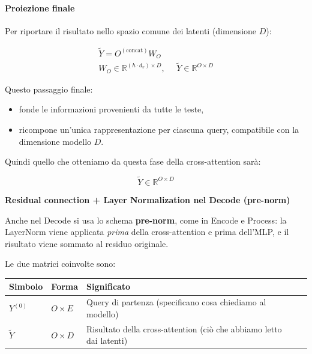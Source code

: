 \documentclass[
  11pt,
]{article}
\newcounter{none} %
\begin{document}
\paragraph{Proiezione finale}

Per riportare il risultato nello spazio comune dei latenti (dimensione
\(D\)):

\[\begin{matrix}
\widetilde{Y} = O^{(\text{concat})}W_{O} \\
W_{O} \in \mathbb{R}^{\left( h \cdot d_{v} \right) \times D},\ \ \ \ \ \ \widetilde{Y} \in \mathbb{R}^{O \times D}
\end{matrix}\]

Questo passaggio finale:

\begin{itemize}
\item
  fonde le informazioni provenienti da tutte le teste,
\item
  ricompone un'unica rappresentazione per ciascuna
  query, compatibile con la dimensione modello \(D\).
\end{itemize}

Quindi quello che otteniamo da questa fase della cross-attention sarà:

\[\widetilde{Y} \in \mathbb{R}^{O \times D}\]

\textbf{Residual connection + Layer Normalization nel Decode (pre-norm)}

Anche nel Decode si usa lo schema \textbf{pre-norm}, come in Encode e Process: la LayerNorm viene applicata \emph{prima} della cross-attention e prima dell'MLP, e il risultato viene sommato al residuo originale.

Le due matrici coinvolte sono:

{\def\LTcaptype{none} %
\begin{longtable}{@{}
  >{\raggedright\arraybackslash}p{}
  >{\raggedright\arraybackslash}p{}
  >{\raggedright\arraybackslash}p{}
  >{\raggedright\arraybackslash}p{}@{}}
\toprule\noalign{}
\begin{minipage}[b]{\linewidth}\centering
\textbf{Simbolo}
\end{minipage} & \begin{minipage}[b]{\linewidth}\centering
\textbf{Forma}
\end{minipage} & \begin{minipage}[b]{\linewidth}\centering
\textbf{Significato}
\end{minipage} & \begin{minipage}[b]{\linewidth}\centering
\end{minipage} \\
\midrule\noalign{}
\endhead
\bottomrule\noalign{}
\endlastfoot
\(Y^{(0)}\) & \(O \times E\) & Query di partenza (specificano cosa
chiediamo al modello) & \\
\(\widetilde{Y}\) & \(O \times D\) & Risultato della cross-attention
(ciò che abbiamo letto dai latenti) & \\
\end{longtable}
}
\end{document}
